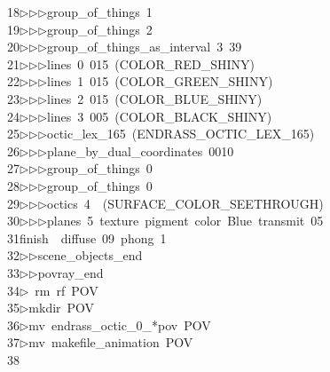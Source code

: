\begin{tabbing}
18\>$\triangleright$\>$\triangleright$\>$\triangleright$\>group\_of\_things\ 1\ \\[0pt]
19\>$\triangleright$\>$\triangleright$\>$\triangleright$\>group\_of\_things\ 2\ \\[0pt]
20\>$\triangleright$\>$\triangleright$\>$\triangleright$\>group\_of\_things\_as\_interval\ 3\ 39\ \\[0pt]
21\>$\triangleright$\>$\triangleright$\>$\triangleright$\>lines\ 0\ 015\ (COLOR\_RED\_SHINY)\ \\[0pt]
22\>$\triangleright$\>$\triangleright$\>$\triangleright$\>lines\ 1\ 015\ (COLOR\_GREEN\_SHINY)\ \\[0pt]
23\>$\triangleright$\>$\triangleright$\>$\triangleright$\>lines\ 2\ 015\ (COLOR\_BLUE\_SHINY)\ \\[0pt]
24\>$\triangleright$\>$\triangleright$\>$\triangleright$\>lines\ 3\ 005\ (COLOR\_BLACK\_SHINY)\ \\[0pt]
25\>$\triangleright$\>$\triangleright$\>$\triangleright$\>octic\_lex\_165\ (ENDRASS\_OCTIC\_LEX\_165)\ \\[0pt]
26\>$\triangleright$\>$\triangleright$\>$\triangleright$\>plane\_by\_dual\_coordinates\ 0010\ \\[0pt]
27\>$\triangleright$\>$\triangleright$\>$\triangleright$\>group\_of\_things\ 0\ \\[0pt]
28\>$\triangleright$\>$\triangleright$\>$\triangleright$\>group\_of\_things\ 0\ \\[0pt]
29\>$\triangleright$\>$\triangleright$\>$\triangleright$\>octics\ 4\ \ (SURFACE\_COLOR\_SEETHROUGH)\ \\[0pt]
30\>$\triangleright$\>$\triangleright$\>$\triangleright$\>planes\ 5\ texture\ pigment\ color\ Blue\ transmit\ 05\ \ \\[0pt]
31\>finish\ \ diffuse\ 09\ phong\ 1\ \\[0pt]
32\>$\triangleright$\>$\triangleright$\>scene\_objects\_end\ \\[0pt]
33\>$\triangleright$\>$\triangleright$\>povray\_end\\[0pt]
34\>$\triangleright$\>\ rm\ rf\ POV\\[0pt]
35\>$\triangleright$\>mkdir\ POV\\[0pt]
36\>$\triangleright$\>mv\ endrass\_octic\_0\_*pov\ POV\\[0pt]
37\>$\triangleright$\>mv\ makefile\_animation\ POV\\[0pt]
38\>\end{tabbing}
